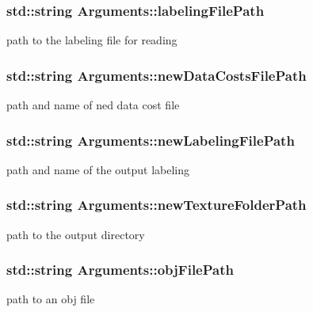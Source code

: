 \subsubsection[{labeling\+File\+Path}]{\setlength{\rightskip}{0pt plus 5cm}std\+::string Arguments\+::labeling\+File\+Path}\label{struct_arguments_ad753fef0a788c9868deb592ee39e0528}
path to the labeling file for reading \hypertarget{struct_arguments_ae1b263850d63b7595ba4e6fd0ae525b3}{}
\subsubsection[{new\+Data\+Costs\+File\+Path}]{\setlength{\rightskip}{0pt plus 5cm}std\+::string Arguments\+::new\+Data\+Costs\+File\+Path}\label{struct_arguments_ae1b263850d63b7595ba4e6fd0ae525b3}
path and name of ned data cost file \hypertarget{struct_arguments_a4a043101d13a6c0540f501af85a691ce}{}
\subsubsection[{new\+Labeling\+File\+Path}]{\setlength{\rightskip}{0pt plus 5cm}std\+::string Arguments\+::new\+Labeling\+File\+Path}\label{struct_arguments_a4a043101d13a6c0540f501af85a691ce}
path and name of the output labeling \hypertarget{struct_arguments_aacc8cf735f8d2793e4fbd81d05f22918}{}
\subsubsection[{new\+Texture\+Folder\+Path}]{\setlength{\rightskip}{0pt plus 5cm}std\+::string Arguments\+::new\+Texture\+Folder\+Path}\label{struct_arguments_aacc8cf735f8d2793e4fbd81d05f22918}
path to the output directory \hypertarget{struct_arguments_a5615cc24abc162c63ef3aedc135b0db4}{}
\subsubsection[{obj\+File\+Path}]{\setlength{\rightskip}{0pt plus 5cm}std\+::string Arguments\+::obj\+File\+Path}\label{struct_arguments_a5615cc24abc162c63ef3aedc135b0db4}
path to an obj file \hypertarget{struct_arguments_a784aabe9dd9bbeb828d1ad845b72887c}{}
